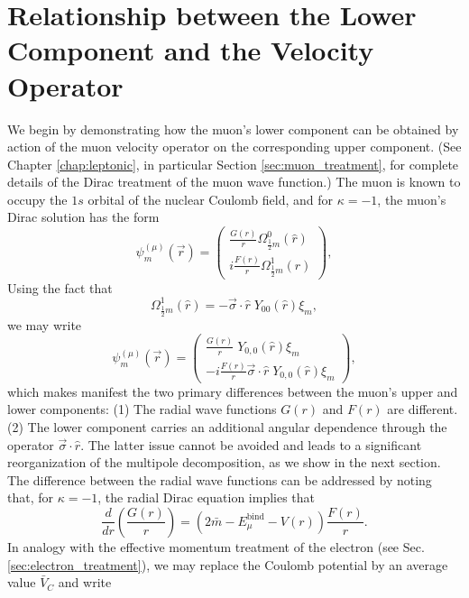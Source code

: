 \documentclass[12pt,letterpaper]{book}
\begin{document}
\section{Relationship between the Lower Component and the Velocity Operator}
We begin by demonstrating how the muon's lower component can be obtained by action of the muon velocity operator on the corresponding upper component. (See Chapter \ref{chap:leptonic}, in particular Section \ref{sec:muon_treatment}, for complete details of the Dirac treatment of the muon wave function.) The muon is known to occupy the $1s$ orbital of the nuclear Coulomb field, and for $\kappa=-1$, the muon's Dirac solution has the form
\begin{equation}
\psi^{(\mu)}_m(\vec{r})=\left(\begin{array}{c}
\frac{G(r)}{r}\Omega^0_{\frac{1}{2}m}(\hat{r})\\
i\frac{F(r)}{r}\Omega^1_{\frac{1}{2}m}(\hat{r})
\end{array}\right),
\end{equation}
Using the fact that 
\begin{equation}
\Omega^1_{\frac{1}{2}m}(\hat{r})=-\vec{\sigma}\cdot\hat{r}\;Y_{00}(\hat{r})\xi_m,
\end{equation}
we may write
\begin{equation}
\psi^{(\mu)}_m(\vec{r})=\left(\begin{array}{c}
\frac{G(r)}{r}\;Y_{0,0}(
\hat{r})\xi_m\\
-i\frac{F(r)}{r}\vec{\sigma}\cdot\hat{r}\;Y_{0,0}(\hat{r})\xi_m
\end{array}\right),
\end{equation}
which makes manifest the two primary differences between the muon's upper and lower components: (1) The radial wave functions $G(r)$ and $F(r)$ are different. (2) The lower component carries an additional angular dependence through the operator $\vec{\sigma}\cdot \hat{r}$. The latter issue cannot be avoided and leads to a significant reorganization of the multipole decomposition, as we show in the next section. The difference between the radial wave functions can be addressed by noting that, for $\kappa=-1$, the radial Dirac equation implies that
\begin{equation}
\frac{d}{dr}\left(\frac{G(r)}{r}\right)=\left(2\bar{m}-E^\mathrm{bind}_{\mu}-V(r)\right)\frac{F(r)}{r}.
\end{equation}
In analogy with the effective momentum treatment of the electron (see Sec. \ref{sec:electron_treatment}), we may replace the Coulomb potential by an average value $\bar{V}_C$ and write
\end{document}
